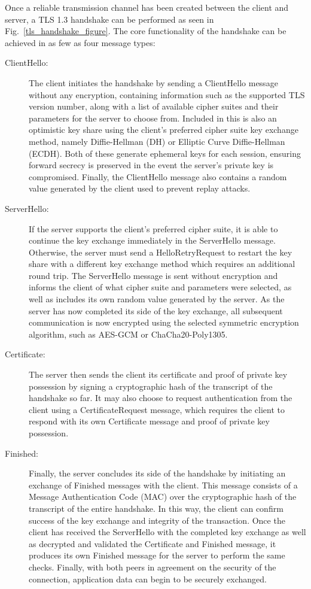 Once a reliable transmission channel has been created between the client and server, a TLS 1.3 handshake can be performed as seen in Fig.~\ref{tls_handshake_figure}. The core functionality of the handshake can be achieved in as few as four message types:

\begin{description}
	\item[ClientHello:] The client initiates the handshake by sending a ClientHello message without any encryption, containing information such as the supported TLS version number, along with a list of available cipher suites and their parameters for the server to choose from. Included in this is also an optimistic key share using the client's preferred cipher suite key exchange method, namely Diffie-Hellman (DH) or Elliptic Curve Diffie-Hellman (ECDH). Both of these generate ephemeral keys for each session, ensuring forward secrecy is preserved in the event the server's private key is compromised. Finally, the ClientHello message also contains a random value generated by the client used to prevent replay attacks.
	\item[ServerHello:] If the server supports the client's preferred cipher suite, it is able to continue the key exchange immediately in the ServerHello message. Otherwise, the server must send a HelloRetryRequest to restart the key share with a different key exchange method which requires an additional round trip. The ServerHello message is sent without encryption and informs the client of what cipher suite and parameters were selected, as well as includes its own random value generated by the server. As the server has now completed its side of the key exchange, all subsequent communication is now encrypted using the selected symmetric encryption algorithm, such as AES-GCM or ChaCha20-Poly1305.
	\item[Certificate:] The server then sends the client its certificate and proof of private key possession by signing a cryptographic hash of the transcript of the handshake so far. It may also choose to request authentication from the client using a CertificateRequest message, which requires the client to respond with its own Certificate message and proof of private key possession.
	\item[Finished:] Finally, the server concludes its side of the handshake by initiating an exchange of Finished messages with the client. This message consists of a Message Authentication Code (MAC) over the cryptographic hash of the transcript of the entire handshake. In this way, the client can confirm success of the key exchange and integrity of the transaction. Once the client has received the ServerHello with the completed key exchange as well as decrypted and validated the Certificate and Finished message, it produces its own Finished message for the server to perform the same checks. Finally, with both peers in agreement on the security of the connection, application data can begin to be securely exchanged.
\end{description}


